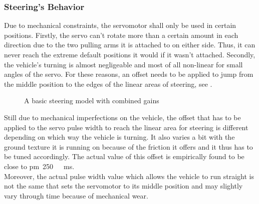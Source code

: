 \subsubsection{Steering's Behavior}
Due to mechanical constraints, the servomotor shall only be used in certain positions. 
Firstly, the servo can't rotate more than a certain amount in each direction due to the two pulling arms it is attached to on either side. Thus, it can never reach the extreme default positions it would if it wasn't attached.
Secondly, the vehicle's turning is almost negligeable and most of all non-linear for small angles of the servo. For these reasons, an offset needs to be applied to jump from the middle position to the edges of the linear areas of steering, see .

\begin{figure}[H]
  \centering
  \caption{A basic steering model with combined gains}
  \label{fig:servoSteeringLinearArea}
\end{figure}

Still due to mechanical imperfections on the vehicle, the offset that has to be applied to the servo pulse width to reach the linear area for steering is different depending on which way the vehicle is turning. It also varies a bit with the ground texture it is running on because of the friction it offers and it thus has to be tuned accordingly.
The actual value of this offset is empirically found to be close to \si{\pm 250\ ms}.\\
%
Moreover, the actual pulse width value which allows the vehicle to run straight is not the same that sets the servomotor to its middle position and may slightly vary through time because of mechanical wear.